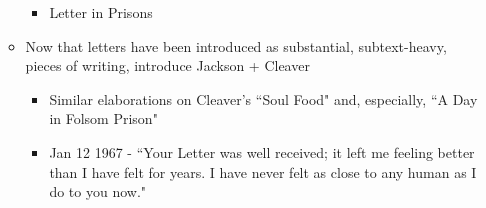 \documentclass[14pt, letterpaper]{report}
\begin{document}
\begin{enumerate}
\begin{itemize}
\begin{itemize}
				\item Letter in Prisons
%		
%					
%				
%
%
%				
				
			\end{itemize}

			\item   Now that letters have been introduced as substantial, subtext-heavy, 
			        pieces of writing, introduce Jackson + Cleaver
				\begin{itemize}
				
					
					\item Similar elaborations on Cleaver's ``Soul Food" and, especially, ``A Day in Folsom Prison"

					\item   Jan 12 1967 - ``Your Letter was well received; it left me feeling better 
						than I have felt for years. I have never felt as close to any human as I 
						do to you now."\autocite[99]{soledad-brother}


\end{itemize}
\end{itemize}
\end{enumerate}
\end{document}
